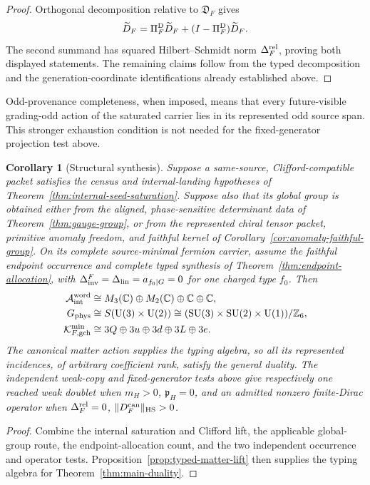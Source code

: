 \documentclass[11pt]{article}
\numberwithin{equation}{section}
\newtheorem{corollary}[theorem]{Corollary}
\theoremstyle{definition}
\theoremstyle{remark}
\newcommand{\Z}{\mathbb Z}
\newcommand{\C}{\mathbb C}
\newcommand{\U}{\mathrm U}
\newcommand{\SU}{\mathrm{SU}}
\newcommand{\HS}{\mathrm{HS}}
\newcommand{\A}{\mathcal A}
\begin{document}
\begin{proof}
Orthogonal decomposition relative to $\mathfrak D_F$ gives
\[
 \widetilde D_F
 =\Pi_F^{\rm D}\widetilde D_F
 +(I-\Pi_F^{\rm D})\widetilde D_F.
\]
The second summand has squared Hilbert--Schmidt norm
$\Delta_F^{\rm rel}$, proving both displayed statements.  The remaining
claims follow from the typed decomposition and the generation-coordinate
identifications already established above.
\end{proof}

Odd-provenance completeness, when imposed, means that every future-visible
grading-odd action of the saturated carrier lies in its represented odd
source span.  This stronger exhaustion condition is not needed for the
fixed-generator projection test above.

\begin{corollary}[Structural synthesis]
\label{thm:structural-SM}
Suppose a same-source, Clifford-compatible packet satisfies the census and
internal-landing hypotheses of Theorem~\ref{thm:internal-seed-saturation}.
Suppose also that its global group is obtained either from the aligned,
phase-sensitive determinant data of Theorem~\ref{thm:gauge-group}, or from
the represented chiral tensor packet, primitive anomaly freedom, and faithful
kernel of Corollary~\ref{cor:anomaly-faithful-group}.
On its complete source-minimal fermion carrier, assume the faithful endpoint
occurrence and complete typed synthesis of Theorem~\ref{thm:endpoint-allocation},
with $\Delta_{\rm inv}^F=\Delta_{\rm lin}=a_{f_0\mid G}=0$ for one charged
type $f_0$.  Then
\begin{align}
 \A_{\rm int}^{\rm word}&\cong M_3(\C)\oplus M_2(\C)\oplus\C\oplus\C,
 \nonumber\\
 G_{\rm phys}&\cong S(\U(3)\times\U(2))
       \cong(\SU(3)\times\SU(2)\times\U(1))/\Z_6,\nonumber\\
 \mathcal K_{F,\rm gch}^{\min}&\cong3Q\oplus3u\oplus3d\oplus3L\oplus3e.
 \label{eq:structural-synthesis}
\end{align}
The canonical matter action supplies the typing algebra, so all its represented
incidences, of arbitrary coefficient rank, satisfy the general duality.
The independent weak-copy and fixed-generator tests above give respectively
one reached weak doublet when $m_H>0$, $\mathfrak p_H=0$, and an admitted
nonzero finite-Dirac operator when $\Delta_F^{\rm rel}=0$,
$\|D_F^{\rm can}\|_{\HS}>0$.
\end{corollary}
\begin{proof}
Combine the internal saturation and Clifford lift, the applicable global-group
route, the endpoint-allocation count, and the two independent occurrence and
operator tests.  Proposition~\ref{prop:typed-matter-lift} then supplies the
typing algebra for Theorem~\ref{thm:main-duality}.
\end{proof}
\end{document}
